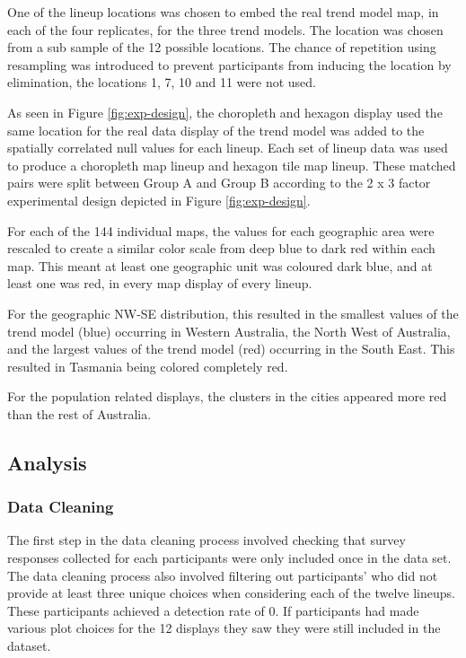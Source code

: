 \documentclass{monashthesis}
\begin{document}
One of the lineup locations was chosen to embed the real trend model map, in each of the four replicates, for the three trend models.
The location was chosen from a sub sample of the 12 possible locations. The chance of repetition using resampling was introduced to prevent participants from inducing the location by elimination, the locations 1, 7, 10 and 11 were not used.

As seen in Figure \ref{fig:exp-design}, the choropleth and hexagon display used the same location for the real data display of the trend model was added to the spatially correlated null values for each lineup.
Each set of lineup data was used to produce a choropleth map lineup and hexagon tile map lineup. These matched pairs were split between Group A and Group B according to the 2 x 3 factor experimental design depicted in Figure \ref{fig:exp-design}.

For each of the 144 individual maps, the values for each geographic area were rescaled to create a similar color scale from deep blue to dark red within each map.
This meant at least one geographic unit was coloured dark blue, and at least one was red, in every map display of every lineup.

For the geographic NW-SE distribution, this resulted in the smallest values of the trend model (blue) occurring in Western Australia, the North West of Australia, and the largest values of the trend model (red) occurring in the South East. This resulted in Tasmania being colored completely red.

For the population related displays, the clusters in the cities appeared more red than the rest of Australia.

\hypertarget{analysis}{%
\subsection{Analysis}\label{analysis}}

\hypertarget{data-cleaning}{%
\subsubsection{Data Cleaning}\label{data-cleaning}}

The first step in the data cleaning process involved checking that survey responses collected for each participants were only included once in the data set.
The data cleaning process also involved filtering out participants' who did not provide at least three unique choices when considering each of the twelve lineups. These participants achieved a detection rate of 0. If participants had made various plot choices for the 12 displays they saw they were still included in the dataset.
\end{document}
